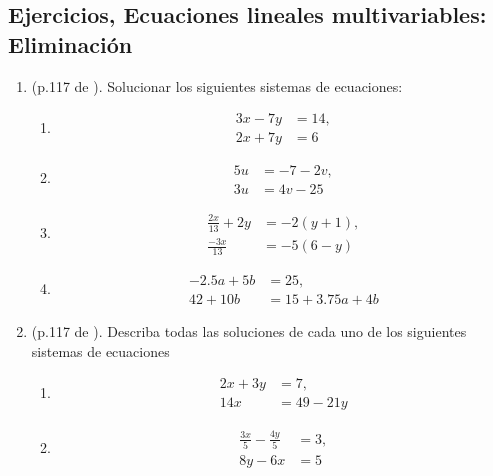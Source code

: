 \newpage
\begin{center}
	\vspace{-1cm}
	\subsection*{Ejercicios, Ecuaciones lineales multivariables: Eliminación }\label{ejercicios:eliminacion}
\end{center}

\begin{enumerate}
	\item (p.117 de \cite{Aops_algebra}). Solucionar los siguientes sistemas de ecuaciones:
	\begin{multicols}{2}
		\begin{enumerate}[label=\Alph*)]
			\item \begin{align*} 3x-7y&=14, \\ 2x+7y &= 6\end{align*}
			\item \begin{align*} 5u&=-7-2v, \\ 3u &= 4v-25\end{align*}
			\item \begin{align*} \frac{2x}{13} +2y &= -2(y+1), \\ \frac{-3x}{13}&= -5(6-y)\end{align*}				
			\item \begin{align*} -2.5a +5b &=25, \\ 42+10b &= 15 + 3.75a + 4b\end{align*}				
		\end{enumerate}
	\end{multicols}
	
	\item (p.117 de \cite{Aops_algebra}). Describa todas las soluciones de cada uno de los siguientes sistemas de ecuaciones
	\begin{multicols}{2}
		\begin{enumerate}[label=\Alph*)]
			\item \begin{align*} 2x+3y&=7, \\ 14x &= 49 - 21y\end{align*}
			\item \begin{align*} \frac{3x}{5} - \frac{4y}{5} &= 3, \\ 8y-6x &=5\end{align*}		
		\end{enumerate}
	\end{multicols}
	

\end{enumerate}
